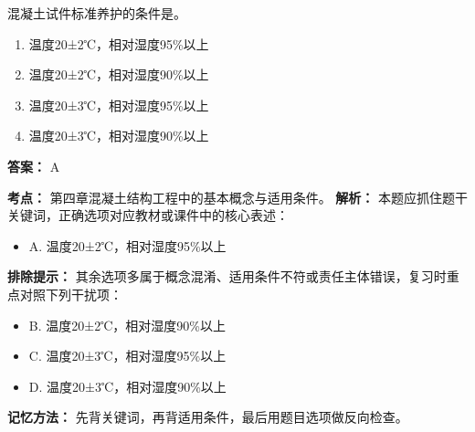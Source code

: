 \documentclass[UTF8,fontset=fandol,11pt]{ctexart}
\begin{document}
\vspace{0.2em}

\begin{quizbox}[title={第 52 题}]
混凝土试件标准养护的条件是。\\
\begin{enumerate}[label=\Alph*.]
\item 温度20±2℃，相对湿度95\%以上
\item 温度20±2℃，相对湿度90\%以上
\item 温度20±3℃，相对湿度95\%以上
\item 温度20±3℃，相对湿度90\%以上
\end{enumerate}
\textbf{答案：} A
\vspace{0.25em}
\begin{answerbox}[title={考点解析}]
\textbf{考点：} 第四章混凝土结构工程中的基本概念与适用条件。
\textbf{解析：} 本题应抓住题干关键词，正确选项对应教材或课件中的核心表述：
\begin{itemize}
\item A. 温度20±2℃，相对湿度95\%以上
\end{itemize}
\textbf{排除提示：} 其余选项多属于概念混淆、适用条件不符或责任主体错误，复习时重点对照下列干扰项：
\begin{itemize}
\item B. 温度20±2℃，相对湿度90\%以上
\item C. 温度20±3℃，相对湿度95\%以上
\item D. 温度20±3℃，相对湿度90\%以上
\end{itemize}
\textbf{记忆方法：} 先背关键词，再背适用条件，最后用题目选项做反向检查。
\end{answerbox}
\end{quizbox}

\vspace{0.2em}
\end{document}
